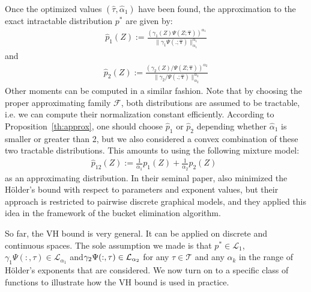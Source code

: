 \documentclass{article} %
\newcommand{\Holder}{H\"older\xspace}
\newcommand{\tauspace}{\mathcal{T}}
\def\btau{{\bm{\tau}}}
\def\proba{p}
\begin{document}
Once the optimized values $(\hat\tau,\hat\alpha_1)$ have been found, the approximation to the exact intractable distribution $\proba^*$ are given by:
\begin{eqnarray}
\hat\proba_1(Z) := \frac{(\gamma_1(Z)\Psi(Z;\hat\btau))^{\alpha_1}}{\|\gamma_1\Psi(.;\hat\btau)\|^{\alpha_1}_{\alpha_1}}
\end{eqnarray}
and 
\begin{eqnarray}
\hat\proba_2(Z) := \frac{(\gamma_2(Z)/\Psi(Z;\hat\btau))^{\alpha_2}}{\|\gamma_2/\Psi(.;\hat\btau)\|^{\alpha_2}_{\alpha_2}}
\end{eqnarray}
Other moments can be computed in a similar fashion. 
Note that by choosing the proper approximating family $\mathcal{F}$, both distributions are assumed to be tractable, i.e. we can compute their normalization constant efficiently.
According to Proposition~\ref{th:approx}, one should choose $\hat\proba_1$ or $\hat\proba_2$ depending whether $\hat\alpha_1$ is 
smaller or greater than 2, but we also considered a convex combination of these two tractable distributions. This amounts to using the 
following mixture model:
\begin{eqnarray}
\hat\proba_{12}(Z) := \frac {1}{\alpha_1}\proba_1(Z) + \frac {1}{\alpha_2}\proba_2(Z)
\enspace
\end{eqnarray}
as an approximating distribution.
In their seminal paper, \citet{liu11d} also minimized the \Holder's bound with respect to parameters and exponent values, but
their approach is restricted to pairwise discrete graphical models, and they applied this idea in the framework of the bucket elimination algorithm.

So far, the VH bound is very general. It can be applied on discrete and continuous spaces. The sole assumption we made is that $\proba^*\in\mathcal{L}_1$, $\gamma_1\Psi(:,\tau)\in\mathcal{L}_{\alpha_1}$ and$\gamma_2\/\Psi(:,\tau)\in\mathcal{L}_{\alpha_2}$ for any $\tau\in\tauspace$ and any $\alpha_k$ in the
range of \Holder's exponents that are considered. We now turn on to a specific class of functions to illustrate how the VH bound is used in practice.

%
\end{document}
